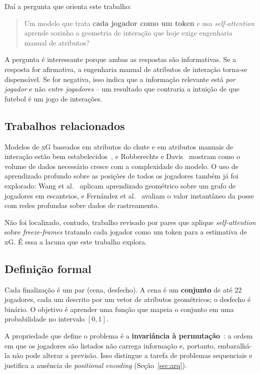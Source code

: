 \documentclass[12pt]{article}
\begin{document}
Daí a pergunta que orienta este trabalho:

\begin{quote}
Um modelo que trata \textbf{cada jogador como um token} e usa \emph{self-attention}
aprende sozinho a geometria de interação que hoje exige engenharia manual de
atributos?
\end{quote}

A pergunta é interessante porque ambas as respostas são informativas. Se a
resposta for afirmativa, a engenharia manual de atributos de interação torna-se
dispensável. Se for negativa, isso indica que a informação relevante está
\emph{por jogador} e não \emph{entre jogadores} -- um resultado que contraria a
intuição de que futebol é um jogo de interações.

\subsection{Trabalhos relacionados}

Modelos de xG baseados em atributos do chute e em atributos manuais de interação
estão bem estabelecidos~\cite{rathke2017examination,anzer2021goal,mead2023expected,iapteff2025interpretable},
e Robberechts e Davis~\cite{robberechts2020data} mostram como o volume de dados necessário
cresce com a complexidade do modelo. O uso de aprendizado profundo sobre as
posições de todos os jogadores também já foi explorado: Wang et al.~\cite{wang2024tacticai}
aplicam aprendizado geométrico sobre um grafo de jogadores em escanteios, e
Fern{\'a}ndez et al.~\cite{fernandez2021framework} avaliam o valor instantâneo da posse com redes
profundas sobre dados de rastreamento.

Não foi localizado, contudo, trabalho revisado por pares que aplique
\emph{self-attention} sobre \emph{freeze-frames} tratando cada jogador como um
token para a estimativa de xG. É essa a lacuna que este trabalho explora.

\subsection{Definição formal}

Cada finalização é um par (cena, desfecho). A cena é um \textbf{conjunto} de até
22 jogadores, cada um descrito por um vetor de atributos geométricos; o desfecho
é binário. O objetivo é aprender uma função que mapeia o conjunto em uma
probabilidade no intervalo $[0,1]$.

A propriedade que define o problema é a \textbf{invariância à permutação}~\cite{zaheer2017,lee2019set}: a
ordem em que os jogadores são listados não carrega informação e, portanto,
embaralhá-la não pode alterar a previsão. Isso distingue a tarefa de problemas
sequenciais e justifica a ausência de \emph{positional encoding}
(Seção~\ref{sec:arq}).
\end{document}
